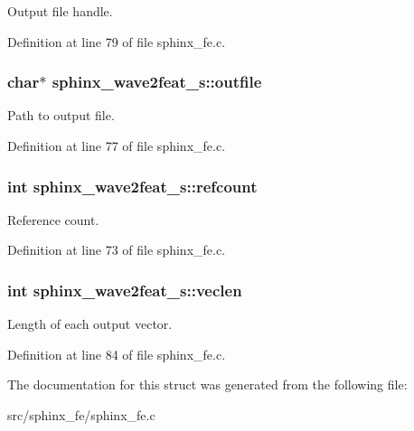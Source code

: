Output file handle. 



Definition at line 79 of file sphinx\-\_\-fe.\-c.

\subsubsection[{outfile}]{\setlength{\rightskip}{0pt plus 5cm}char$\ast$ sphinx\-\_\-wave2feat\-\_\-s\-::outfile}\label{structsphinx__wave2feat__s_aa50405dc75074933912da57295ec5fbf}


Path to output file. 



Definition at line 77 of file sphinx\-\_\-fe.\-c.

\subsubsection[{refcount}]{\setlength{\rightskip}{0pt plus 5cm}int sphinx\-\_\-wave2feat\-\_\-s\-::refcount}\label{structsphinx__wave2feat__s_ae9b2fc4bfa6a3adbf2ee5a71796cdb51}


Reference count. 



Definition at line 73 of file sphinx\-\_\-fe.\-c.

\subsubsection[{veclen}]{\setlength{\rightskip}{0pt plus 5cm}int sphinx\-\_\-wave2feat\-\_\-s\-::veclen}\label{structsphinx__wave2feat__s_ad71e5fca7c13ae0258bcee81a6f1fa89}


Length of each output vector. 



Definition at line 84 of file sphinx\-\_\-fe.\-c.



The documentation for this struct was generated from the following file\-:\begin{DoxyCompactItemize}
\item 
src/sphinx\-\_\-fe/sphinx\-\_\-fe.\-c\end{DoxyCompactItemize}
